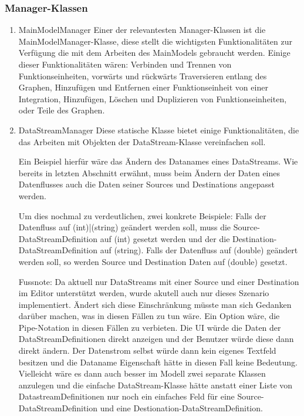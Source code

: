 \subsubsection{Manager-Klassen}
\label{sec:orgheadline13}
\begin{enumerate}
	\item MainModelManager
	\label{sec:orgheadline11}
	Einer der relevantesten Manager-Klassen ist die MainModelManager-Klasse,
	diese stellt die wichtigsten Funktionalitäten zur Verfügung die mit dem
	Arbeiten des MainModels gebraucht werden. Einige dieser Funktionalitäten
	wären: Verbinden und Trennen von Funktionseinheiten, vorwärts und rückwärts
	Traversieren entlang des Graphen, Hinzufügen und Entfernen einer
	Funktionseinheit von einer Integration, Hinzufügen, Löschen und Duplizieren
	von Funktionseinheiten, oder Teile des Graphen.
	
	\item DataStreamManager
	\label{sec:orgheadline12}
	Diese statische Klasse bietet einige Funktionalitäten, die das Arbeiten mit
	Objekten der DataStream-Klasse vereinfachen soll.
	
	Ein Beispiel hierfür wäre das Ändern des Datanames eines DataStreams. 
	Wie bereits in letzten Abschnitt erwähnt, muss beim Ändern der Daten
	eines Datenflusses auch die Daten seiner Sources und Destinations
	angepasst werden. 
	
	Um dies nochmal zu verdeutlichen, zwei konkrete Beispiele:
	Falls der Datenfluss auf (int)|(string) geändert werden
	soll, muss die Source-DataStreamDefinition auf (int) gesetzt werden und der
	die Destination-DataStreamDefinition auf (string). 
	Falls der Datenfluss auf (double) geändert werden soll, so werden Source
	und Destination Daten auf (double) gesetzt.
	
	Fussnote: Da aktuell nur DataStreams mit einer Source und einer Destination im Editor unterstützt
	werden, wurde akutell auch nur dieses Szenario implementiert. Ändert sich
	diese Einschränkung müsste man sich Gedanken darüber machen, was in diesen
	Fällen zu tun wäre. Ein Option wäre, die Pipe-Notation in diesen Fällen zu
	verbieten. Die UI würde die Daten der DataStreamDefinitionen direkt
	anzeigen und der Benutzer würde diese dann direkt ändern. Der Datenstrom
	selbst würde dann kein eigenes Textfeld besitzen und die Dataname
	Eigenschaft hätte in diesen Fall keine Bedeutung. 
	Vielleicht wäre es dann auch besser im Modell zwei separate Klassen
	anzulegen und die
	einfache DataStream-Klasse hätte anstatt einer Liste von DatastreamDefinitionen nur noch ein einfaches Feld
	für eine Source-DataStreamDefinition und eine Destionation-DataStreamDefinition.
	

\end{enumerate}
